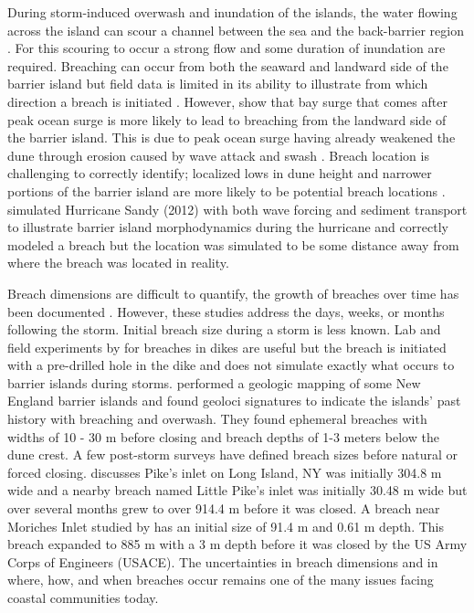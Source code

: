 \documentclass{coastal_paper}
\begin{document}
During storm-induced overwash and inundation of the islands, the water flowing across the island can scour a channel between the sea and the back-barrier region \citep{Kraus2003, Pierce1970, Roelvink2009}. For this scouring to occur a strong flow and some duration of inundation are required. Breaching can occur from both the seaward and landward side of the barrier island but field data is limited in its ability to illustrate from which direction a breach is initiated \citep{Kraus2003, Pierce1970, Smallegan2017}. However, \citet{Smallegan2017} show that bay surge that comes after peak ocean surge is more likely to lead to breaching from the landward side of the barrier island. This is due to peak ocean surge having already weakened the dune through erosion caused by wave attack and swash \citep{Kraus2003, Smallegan2017}. Breach location is challenging to correctly identify; localized lows in dune height and narrower portions of the barrier island are more likely to be potential breach locations \citep{Kraus2003, Kraus2003a}. \citet{Vander2019} simulated Hurricane Sandy (2012) with both wave forcing and sediment transport to illustrate barrier island morphodynamics during the hurricane and correctly modeled a breach but the location was simulated to be some distance away from where the breach was located in reality. 

Breach dimensions are difficult to quantify, the growth of breaches over time has been documented \citep{Kraus2003a, Schmeltz1983Breach/InletInlet.}. However, these studies address the days, weeks, or months following the storm. Initial breach size during a storm is less known. Lab and field experiments by \citet{Visser1999} for breaches in dikes are useful but the breach is initiated with a pre-drilled hole in the dike and does not simulate exactly what occurs to barrier islands during storms. \citet{Buynevich2006} performed a geologic mapping of some New England barrier islands and found geoloci signatures to indicate the islands' past history with breaching and overwash. They found ephemeral breaches with widths of 10 - 30 m before closing and breach depths of 1-3 meters below the dune crest. A few post-storm surveys have defined breach sizes before natural or forced closing. \cite{Kraus2003a} discusses Pike's inlet on Long Island, NY was initially 304.8 m wide and a nearby breach named Little Pike's inlet was initially 30.48 m wide but over several months grew to over 914.4 m before it was closed. A breach near Moriches Inlet studied by \cite{Schmeltz1983Breach/InletInlet.} has an initial size of 91.4 m and 0.61 m depth. This breach expanded to 885 m with a 3 m depth before it was closed by the US Army Corps of Engineers (USACE). The uncertainties in breach dimensions and  in where, how, and when breaches occur remains one of the many issues facing coastal communities today.
\end{document}
